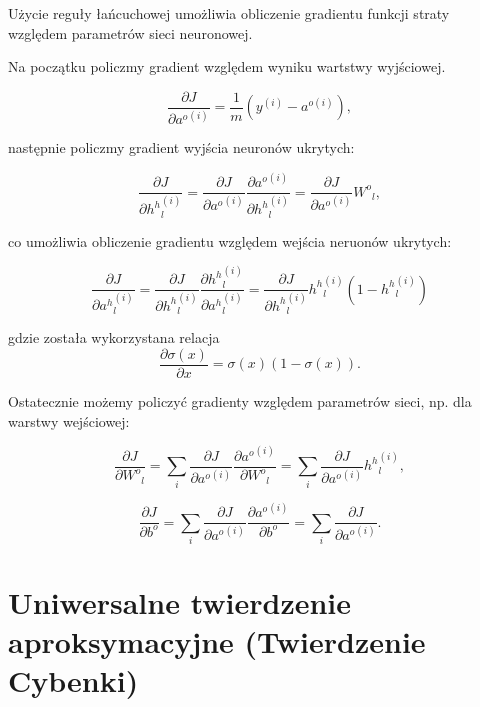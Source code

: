 \documentclass[11pt]{book}
\theoremstyle{definition}
\begin{document}
Użycie reguły łańcuchowej umożliwia obliczenie gradientu funkcji straty względem parametrów sieci neuronowej.

Na początku policzmy gradient względem wyniku wartstwy wyjściowej.



\begin{equation}
\frac{\partial J}{\partial {a^o}^{(i)}} = \frac{1}{m} \left( y^{(i)}- a^{o{(i)}}  \right),
\end{equation}

następnie policzmy gradient wyjścia neuronów ukrytych:

\begin{equation}
\frac{\partial J}{\partial {h^h}^{(i)}_l} = \frac{\partial J}{\partial {a^o}^{(i)}} \frac{\partial {a^o}^{(i)}}{\partial {h^h}^{(i)}_l} =  \frac{\partial J}{\partial {a^o}^{(i)}} {W^o}_{l},
\end{equation}

co umożliwia obliczenie gradientu względem wejścia neruonów ukrytych:

\begin{equation}
\frac{\partial J}{\partial {a^h}^{(i)}_l} = \frac{\partial J}{\partial {h^h}^{(i)}_l}\frac{\partial {h^h}^{(i)}_l}{\partial {a^h}^{(i)}_l} = \frac{\partial J}{\partial {h^h}^{(i)}_l} {h^h}^{(i)}_l(1-{h^h}^{(i)}_l) 
\end{equation}

gdzie została wykorzystana relacja
$$\frac{\partial \sigma(x)}{\partial x} = \sigma(x)(1-\sigma(x)).$$


Ostatecznie możemy policzyć gradienty względem parametrów sieci, np. dla warstwy wejściowej:

\begin{equation}
\frac{\partial J}{\partial {W^o}_{l}} = \sum_{i}\frac{\partial J}{\partial {a^o}^{(i)}}\frac{\partial {a^o}^{(i)}}{\partial {W^o}_{l}} = \sum_{i}\frac{\partial J}{\partial {a^o}^{(i)}}{h^h}^{(i)}_l,
\end{equation}

\begin{equation}
\frac{\partial J}{\partial {b^o}} = \sum_{i}\frac{\partial J}{\partial {a^o}^{(i)}}\frac{\partial {a^o}^{(i)}}{\partial {b^o}} = \sum_{i}\frac{\partial J}{\partial {a^o}^{(i)}}.
\end{equation}



\section{Uniwersalne twierdzenie aproksymacyjne (Twierdzenie Cybenki)}
\end{document}
